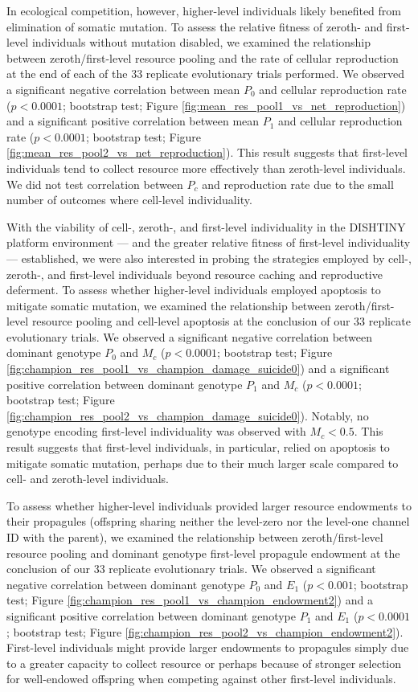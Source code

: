 In ecological competition, however, higher-level individuals likely benefited from elimination of somatic mutation.
To assess the relative fitness of zeroth- and first-level individuals without mutation disabled, we examined the relationship between zeroth/first-level resource pooling and the rate of cellular reproduction at the end of each of the 33 replicate evolutionary trials performed.
We observed a significant negative correlation between mean $P_0$ and cellular reproduction rate ($p < 0.0001$; bootstrap test; Figure \ref{fig:mean_res_pool1_vs_net_reproduction}) and a significant positive correlation between mean $P_1$ and cellular reproduction rate ($p < 0.0001$; bootstrap test; Figure \ref{fig:mean_res_pool2_vs_net_reproduction}).
This result suggests that first-level individuals tend to collect resource more effectively than zeroth-level individuals.
We did not test correlation between $P_{c}$ and reproduction rate due to the small number of outcomes where cell-level individuality.

With the viability of cell-, zeroth-, and first-level individuality in the DISHTINY platform environment --- and the greater relative fitness of first-level individuality --- established, we were also interested in probing the strategies employed by cell-, zeroth-, and first-level individuals beyond resource caching and reproductive deferment.
To assess whether higher-level individuals employed apoptosis to mitigate somatic mutation, we examined the relationship between zeroth/first-level resource pooling and cell-level apoptosis at the conclusion of our 33 replicate evolutionary trials.
We observed a significant negative correlation between dominant genotype $P_0$ and $M_{c}$ ($p < 0.0001$; bootstrap test; Figure \ref{fig:champion_res_pool1_vs_champion_damage_suicide0}) and a significant positive correlation between dominant genotype $P_1$ and $M_{c}$ ($p < 0.0001$; bootstrap test; Figure \ref{fig:champion_res_pool2_vs_champion_damage_suicide0}).
Notably, no genotype encoding first-level individuality was observed with $M_{c} < 0.5$.
This result suggests that first-level individuals, in particular, relied on apoptosis to mitigate somatic mutation, perhaps due to their much larger scale compared to cell- and zeroth-level individuals.

To assess whether higher-level individuals provided larger resource endowments to their propagules (offspring sharing neither the level-zero nor the level-one channel ID with the parent), we examined the relationship between zeroth/first-level resource pooling and dominant genotype first-level propagule endowment at the conclusion of our 33 replicate evolutionary trials.
We observed a significant negative correlation between dominant genotype $P_0$ and $E_1$ ($p < 0.001$; bootstrap test; Figure \ref{fig:champion_res_pool1_vs_champion_endowment2}) and a significant positive correlation between dominant genotype $P_1$ and $E_1$ ($p <  0.0001$; bootstrap test; Figure \ref{fig:champion_res_pool2_vs_champion_endowment2}).
First-level individuals might provide larger endowments to propagules simply due to a greater capacity to collect resource or perhaps because of stronger selection for well-endowed offspring when competing against other first-level individuals.
